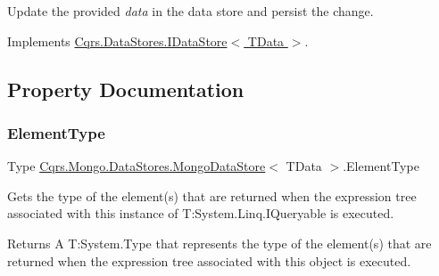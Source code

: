 Update the provided {\itshape data}  in the data store and persist the change. 



Implements \hyperlink{interfaceCqrs_1_1DataStores_1_1IDataStore_a6d5d4dd572de8db01ff0c48d37faefa7_a6d5d4dd572de8db01ff0c48d37faefa7}{Cqrs.\+Data\+Stores.\+I\+Data\+Store$<$ T\+Data $>$}.



\subsection{Property Documentation}
\mbox{\label{classCqrs_1_1Mongo_1_1DataStores_1_1MongoDataStore_a0b55d9ca4d8ac206dd7beec30aa123df_a0b55d9ca4d8ac206dd7beec30aa123df}} 
\subsubsection{\texorpdfstring{Element\+Type}{ElementType}}
{\footnotesize\ttfamily Type \hyperlink{classCqrs_1_1Mongo_1_1DataStores_1_1MongoDataStore}{Cqrs.\+Mongo.\+Data\+Stores.\+Mongo\+Data\+Store}$<$ T\+Data $>$.Element\+Type\hspace{0.3cm}{\ttfamily [get]}}



Gets the type of the element(s) that are returned when the expression tree associated with this instance of T\+:\+System.\+Linq.\+I\+Queryable is executed. 

\begin{DoxyReturn}{Returns}
A T\+:\+System.\+Type that represents the type of the element(s) that are returned when the expression tree associated with this object is executed. 
\end{DoxyReturn}
\mbox{\label{classCqrs_1_1Mongo_1_1DataStores_1_1MongoDataStore_a1a151694ae4eef805bd64aa7a3ae70ed_a1a151694ae4eef805bd64aa7a3ae70ed}} 
